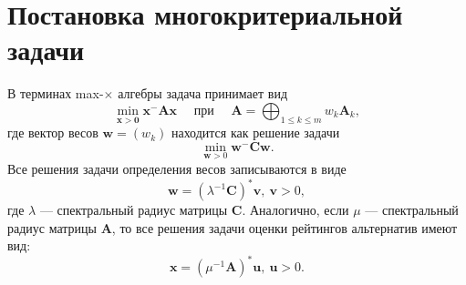 \documentclass[specialist,
	substylefile = spbu.rtx,
	subf,href,colorlinks=true, 12pt]{disser}
\begin{document}
\section{Постановка многокритериальной задачи}



В терминах max-$\times$ алгебры задача принимает вид
$$
	\min _{\mathbf{x}>\mathbf{0}} \mathbf{x}^{-} \mathbf{A} \mathbf{x} \quad \text { при } \quad \mathbf{A}=\bigoplus_{1 \leq k \leq m} w_{k} \mathbf{A}_{k},
$$
где вектор весов $\mathbf{w}=\left(w_{k}\right)$ находится как решение задачи
\[
	\min _{\mathbf{w}>0} \mathbf{w}^{-} \mathbf{C} \mathbf{w}.
\]
Все решения задачи определения весов записываются в виде
\[
	\mathbf{w} = (\lambda^{-1}\mathbf{C})^*\mathbf{v}, ~\mathbf{v} > 0,
\]
где $\lambda$ --- спектральный радиус матрицы $\mathbf{C}$. Аналогично, если $\mu$ --- спектральный радиус матрицы $\mathbf{A}$, то все решения задачи оценки рейтингов альтернатив имеют вид:
\[
	\mathbf{x} = (\mu^{-1}\mathbf{A})^*\mathbf{u},~\mathbf{u} > 0.
\]
\end{document}
